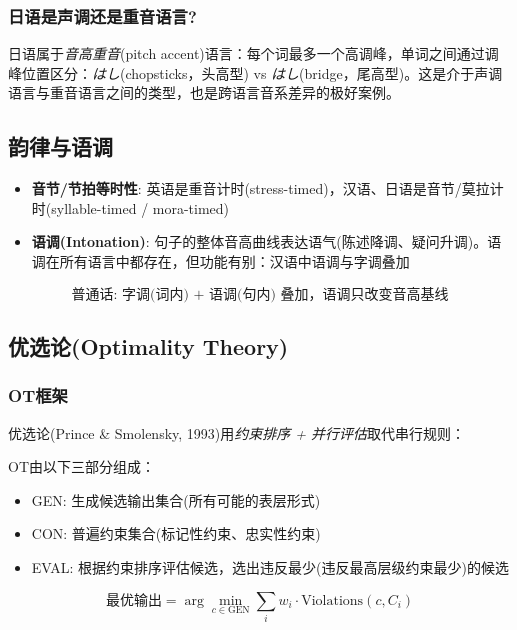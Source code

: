 \subsubsection{日语是声调还是重音语言?}

日语属于\emph{音高重音}(pitch accent)语言：每个词最多一个高调峰，单词之间通过调峰位置区分：\textit{はし}(chopsticks，头高型) vs \textit{はし}(bridge，尾高型)。这是介于声调语言与重音语言之间的类型，也是跨语言音系差异的极好案例。

\subsection{韵律与语调}

\begin{itemize}
    \item \textbf{音节/节拍等时性}: 英语是重音计时(stress-timed)，汉语、日语是音节/莫拉计时(syllable-timed / mora-timed)
    \item \textbf{语调(Intonation)}: 句子的整体音高曲线表达语气(陈述降调、疑问升调)。语调在所有语言中都存在，但功能有别：汉语中语调与字调叠加
\end{itemize}

\begin{equation}
    \text{普通话: 字调(词内) + 语调(句内) 叠加，语调只改变音高基线}
\end{equation}

\subsection{优选论(Optimality Theory)}

\subsubsection{OT框架}

优选论(Prince \& Smolensky, 1993)用\emph{约束排序 + 并行评估}取代串行规则：
\begin{definition}[OT框架]
OT由以下三部分组成：
\begin{itemize}
    \item GEN: 生成候选输出集合(所有可能的表层形式)
    \item CON: 普遍约束集合(标记性约束、忠实性约束)
    \item EVAL: 根据约束排序评估候选，选出违反最少(违反最高层级约束最少)的候选
\end{itemize}
\end{definition}

\begin{equation}
    \text{最优输出} = \arg\min_{c \in \text{GEN}} \sum_{i} w_i \cdot \text{Violations}(c, C_i)
\end{equation}

